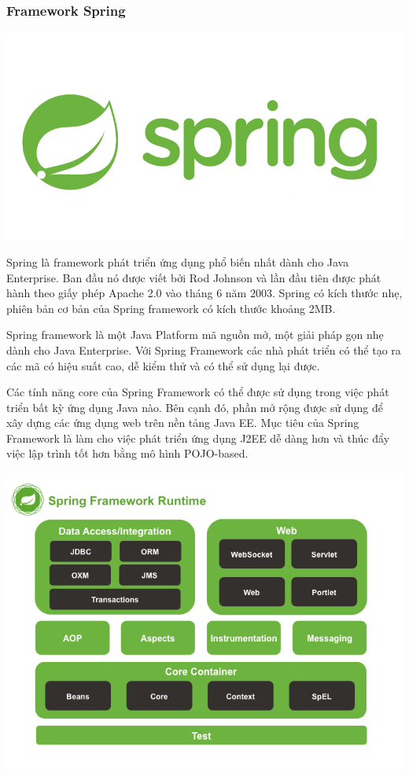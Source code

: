 \subsubsection{Framework Spring}
\begin{center}
  \captionsetup{type=figure}
  \includegraphics[width=15cm]{img/spring.png}
\end{center}

Spring là framework phát triển ứng dụng phổ biến nhất dành cho Java Enterprise. Ban đầu nó được viết bởi Rod Johnson và lần đầu tiên được phát hành theo giấy phép Apache 2.0 vào tháng 6 năm 2003. Spring có kích thước nhẹ, phiên bản cơ bản của Spring framework có kích thước khoảng 2MB.

Spring framework là một Java Platform mã nguồn mở, một giải pháp gọn nhẹ dành cho Java Enterprise. Với Spring Framework các nhà phát triển có thể tạo ra các mã có hiệu suất cao, dễ kiểm thử và có thể sử dụng lại được.

Các tính năng core của Spring Framework có thể được sử dụng trong việc phát triển bất kỳ ứng dụng Java nào. Bên cạnh đó, phần mở rộng được sử dụng để xây dựng các ứng dụng web trên nền tảng Java EE. Mục tiêu của Spring Framework là làm cho việc phát triển ứng dụng J2EE dễ dàng hơn và thúc đẩy việc lập trình tốt hơn bằng mô hình POJO-based.
\begin{center}
  \captionsetup{type=figure}
  \includegraphics[width=15cm]{img/spring_runtime.png}
\end{center}

